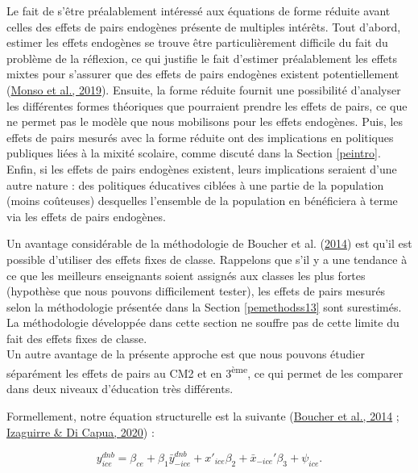 \documentclass[
]{book}
\begin{document}
\quad Le fait de s'être préalablement intéressé aux équations de forme réduite avant celles des effets de pairs endogènes présente de multiples intérêts. Tout d'abord, estimer les effets endogènes se trouve être particulièrement difficile du fait du problème de la réflexion, ce qui justifie le fait d'estimer préalablement les effets mixtes pour s'assurer que des effets de pairs endogènes existent potentiellement (\protect\hyperlink{ref-MON:eal:19}{Monso et al., 2019}). Ensuite, la forme réduite fournit une possibilité d'analyser les différentes formes théoriques que pourraient prendre les effets de pairs, ce que ne permet pas le modèle que nous mobilisons pour les effets endogènes. Puis, les effets de pairs mesurés avec la forme réduite ont des implications en politiques publiques liées à la mixité scolaire, comme discuté dans la Section \ref{peintro}. Enfin, si les effets de pairs endogènes existent, leurs implications seraient d'une autre nature : des politiques éducatives ciblées à une partie de la population (moins coûteuses) desquelles l'ensemble de la population en bénéficiera à terme via les effets de pairs endogènes.

\quad Un avantage considérable de la méthodologie de Boucher et al. (\protect\hyperlink{ref-BOU:eal:14}{2014}) est qu'il est possible d'utiliser des effets fixes de classe. Rappelons que s'il y a une tendance à ce que les meilleurs enseignants soient assignés aux classes les plus fortes (hypothèse que nous pouvons difficilement tester), les effets de pairs mesurés selon la méthodologie présentée dans la Section \ref{pemethodss13} sont surestimés. La méthodologie développée dans cette section ne souffre pas de cette limite du fait des effets fixes de classe.\\
Un autre avantage de la présente approche est que nous pouvons étudier séparément les effets de pairs au CM2 et en 3\textsuperscript{ème}, ce qui permet de les comparer dans deux niveaux d'éducation très différents.

\quad Formellement, notre équation structurelle est la suivante (\protect\hyperlink{ref-BOU:eal:14}{Boucher et al., 2014} ; \protect\hyperlink{ref-IZA:DIC:20}{Izaguirre \& Di Capua, 2020}) :

\begin{equation}
\label{eq:pebeal}
y^{dnb}_{ice} = \beta_{ce} + \beta_1 \bar{y}^{dnb}_{-ice} + x'_{ice} \beta_2 + \bar{x}_{-ice}' \beta_3 + \psi_{ice}.
\end{equation}
\end{document}
